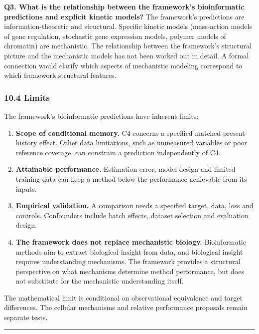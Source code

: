 \documentclass[
]{article}
\begin{document}
\textbf{Q3. What is the relationship between the framework's
bioinformatic predictions and explicit kinetic models?} The framework's
predictions are information-theoretic and structural. Specific kinetic
models (mass-action models of gene regulation, stochastic gene
expression models, polymer models of chromatin) are mechanistic. The
relationship between the framework's structural picture and the
mechanistic models has not been worked out in detail. A formal
connection would clarify which aspects of mechanistic modeling
correspond to which framework structural features.

\hypertarget{limits}{%
\subsubsection{10.4 Limits}\label{limits}}

The framework's bioinformatic predictions have inherent limits:

\begin{enumerate}
\def\labelenumi{(\roman{enumi})}
\item
  \textbf{Scope of conditional memory.} C4 concerns a specified
  matched-present history effect. Other data limitations, such as
  unmeasured variables or poor reference coverage, can constrain a
  prediction independently of C4.
\item
  \textbf{Attainable performance.} Estimation error, model design and
  limited training data can keep a method below the performance
  achievable from its inputs.
\item
  \textbf{Empirical validation.} A comparison needs a specified target,
  data, loss and controls. Confounders include batch effects, dataset
  selection and evaluation design.
\item
  \textbf{The framework does not replace mechanistic biology.}
  Bioinformatic methods aim to extract biological insight from data, and
  biological insight requires understanding mechanisms. The framework
  provides a structural perspective on what mechanisms determine method
  performance, but does not substitute for the mechanistic understanding
  itself.
\end{enumerate}

The mathematical limit is conditional on observational equivalence and
target differences. The cellular mechanisms and relative performance
proposals remain separate tests.

\begin{center}\rule{0.5\linewidth}{0.5pt}\end{center}
\end{document}
